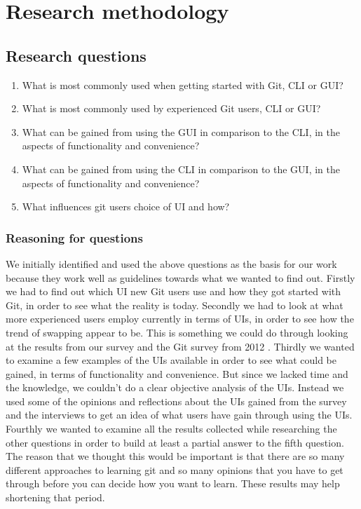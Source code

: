 \documentclass[a4paper,oneside]{bth} %
\begin{document}
		\chapter{Research methodology}
			\section{Research questions}
			\begin{enumerate}
				\item What is most commonly used when getting started with Git, CLI or GUI?
				\item What is most commonly used by experienced Git users, CLI or GUI?
				\item What can be gained from using the GUI in comparison to the CLI, in the aspects of functionality and convenience?
				\item What can be gained from using the CLI in comparison to the GUI, in the aspects of functionality and convenience?
				\item What influences git users choice of UI and how?
			\end{enumerate}
				\subsection{Reasoning for questions}
				We initially identified and used the above questions as the basis for our work because they work well as guidelines towards what we wanted to find out. Firstly we had to find out which UI new Git users use and how they got started with Git, in order to see what the reality is today. Secondly we had to look at what more experienced users employ currently in terms of UIs, in order to see how the trend of swapping appear to be. This is something we could do through looking at the results from our survey and the Git survey from 2012 \cite{GitUserSurvey}. Thirdly we wanted to examine a few examples of the UIs available in order to see what could be gained, in terms of functionality and convenience. But since we lacked time and the knowledge, we couldn't do a clear objective analysis of the UIs. Instead we used some of the opinions and reflections about the UIs gained from the survey and the interviews to get an idea of what users have gain through using the UIs. 
				Fourthly we wanted to examine all the results collected while researching the other questions in order to build at least a partial answer to the fifth question.\\
				The reason that we thought this would be important is that there are so many different approaches to learning git and so many opinions that you have to get through before you can decide how you want to learn. These results may help shortening that period.
\end{document}
